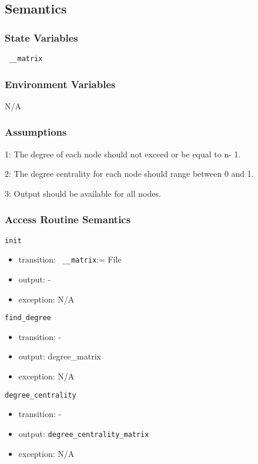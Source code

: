 \documentclass[12pt, titlepage]{article}
\begin{document}
\subsection{Semantics}

\subsubsection{State Variables}

\texttt{ \_\_matrix}

\subsubsection{Environment Variables}

N/A

\subsubsection{Assumptions}

\begin{description}
\item 1: The degree of each node should not exceed or be equal to n- 1.
\item 2: The degree centrality for each node should range between 0 and 1.
\item 3: Output should be available for all nodes.
\end{description}

\subsubsection{Access Routine Semantics}

\noindent \texttt{init}
\begin{itemize}
\item transition: \texttt{ \_\_matrix}:= File 
\item output: -
\item exception: N/A  
\end{itemize}

\noindent \texttt{find\_degree}
\begin{itemize}
\item transition: - 
\item output: {degree\_matrix}
\item exception: N/A  
\end{itemize}

\noindent \texttt{degree\_centrality}
\begin{itemize}
\item transition: - 
\item output: \texttt{degree\_centrality\_matrix}
\item exception: N/A  
\end{itemize}
\end{document}
